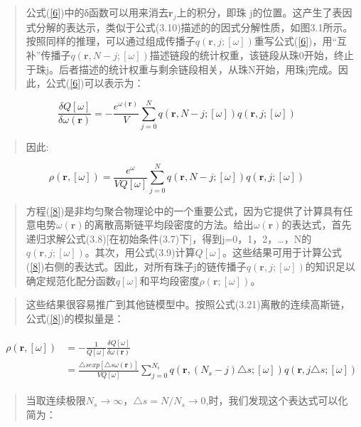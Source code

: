 \begin{quotation}
	公式(\ref{6})中的δ函数可以用来消去$\mathbf{r}_{j}$上的积分，即珠 j的位置。这产生了表因式分解的表达示，类似于公式(3.10)描述的的因式分解性质，如图3.1所示。按照同样的推理，可以通过组成传播子$q(\mathbf{r},j;[\omega])$重写公式(\ref{6})，用“互补”传播子$q(\mathbf{r},N-j;[\omega])$描述链段的统计权重，该链段从珠0开始，终止于珠j。后者描述的统计权重与剩余链段相关，从珠N开始，用珠j完成。因此，公式(\ref{6})可以表示为：
\end{quotation}
\begin{equation}\label{7}
\frac{\delta Q[\omega]}{\delta \omega(\mathbf{\mathbf{\mathbf{r}}})}=-\frac{e^{\omega(\mathbf{r})}}{V}\sum_{j=0}^{N}q(\mathbf{r},N-j;[\omega])q(\mathbf{r},j;[\omega])
\end{equation}
\begin{quotation}
	因此:	
\end{quotation}
\begin{equation}\label{8}
\rho(\mathbf{r},[\omega])=\frac{e^{\omega}}{VQ[\omega]}\sum_{j=0}^{N}q(\mathbf{r},N-j;[\omega])q(\mathbf{r},j;[\omega])
\end{equation}
\begin{quotation}
	方程(\ref{8})是非均匀聚合物理论中的一个重要公式，因为它提供了计算具有任意电势$\omega(\mathbf{r})$的离散高斯链平均段密度的方法。给出$\omega(\mathbf{r})$的表达式，首先递归求解公式(3.8)[在初始条件(3.7)下]，得到j=0，1，2，…，N的$q(\mathbf{r},j;[\omega])$。其次，用公式(3.9)计算$Q[\omega]$。这些结果可用于计算公式(\ref{8})右侧的表达式。因此，对所有珠子j的链传播子$q(\mathbf{r},j;[\omega])$的知识足以确定规范化配分函数$q[\omega]$和平均段密度$\rho(\mathbf{r};[\omega])$。
\end{quotation}
\begin{quotation}
	这些结果很容易推广到其他链模型中。按照公式(3.21)离散的连续高斯链，公式(\ref{8})的模拟量是：
\end{quotation}
\begin{align}\label{9}
\begin{split}
\rho(\mathbf{r},[\omega])&=-\frac{1}{Q[\omega]}\frac{\delta Q[\omega]}{\delta \omega(\mathbf{r})}\\ &=\frac{\triangle s exp[\triangle s\omega(\mathbf{r})]}{VQ[\omega]}\sum_{j=0}^{N_s}q(\mathbf{r},(N_s-j)\triangle s;[\omega])q(\mathbf{r},j\triangle s;[\omega])
\end{split}
\end{align}
\begin{quotation}
	当取连续极限$N_s\to \infty$，$\triangle s=N/N_s\to 0$,时，我们发现这个表达式可以化简为：
\end{quotation}
